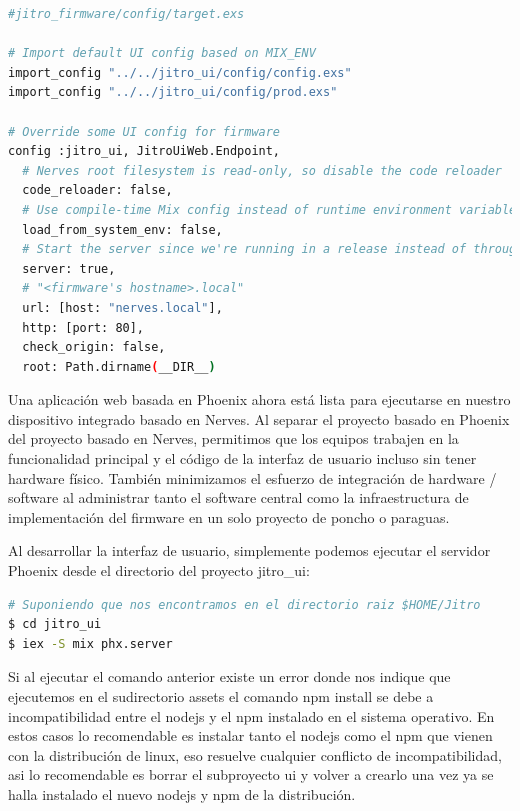 \begin{lstlisting}[language=bash]
#jitro_firmware/config/target.exs

# Import default UI config based on MIX_ENV
import_config "../../jitro_ui/config/config.exs"
import_config "../../jitro_ui/config/prod.exs"

# Override some UI config for firmware
config :jitro_ui, JitroUiWeb.Endpoint,
  # Nerves root filesystem is read-only, so disable the code reloader
  code_reloader: false,
  # Use compile-time Mix config instead of runtime environment variables
  load_from_system_env: false,
  # Start the server since we're running in a release instead of through `mix`
  server: true,
  # "<firmware's hostname>.local"
  url: [host: "nerves.local"],
  http: [port: 80],
  check_origin: false,
  root: Path.dirname(__DIR__)
\end{lstlisting}

Una aplicación web basada en Phoenix ahora está lista para ejecutarse en nuestro dispositivo integrado basado en Nerves. Al separar el proyecto basado en Phoenix del proyecto basado en Nerves, permitimos que los equipos trabajen en la funcionalidad principal y el código de la interfaz de usuario incluso sin tener hardware físico. También minimizamos el esfuerzo de integración de hardware / software al administrar tanto el software central como la infraestructura de implementación del firmware en un solo proyecto de poncho o paraguas.

Al desarrollar la interfaz de usuario, simplemente podemos ejecutar el servidor Phoenix desde el directorio del proyecto jitro\_ui:

\begin{lstlisting}[language=bash]
# Suponiendo que nos encontramos en el directorio raiz $HOME/Jitro
$ cd jitro_ui
$ iex -S mix phx.server
\end{lstlisting}

\begin{note}
Si al ejecutar el comando anterior existe un error donde nos indique que ejecutemos en el sudirectorio assets el comando npm install se debe a incompatibilidad entre el nodejs y el npm instalado en el sistema operativo. En estos casos lo recomendable es instalar tanto el nodejs como el npm que vienen con la distribución de linux, eso resuelve cualquier conflicto de incompatibilidad, asi lo recomendable es borrar el subproyecto ui y volver a crearlo una vez ya se halla instalado el nuevo nodejs y npm de la distribución.
\end{note}

